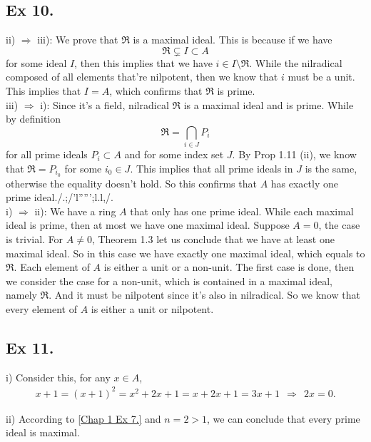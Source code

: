 \subsection{Ex 10.}

ii) $\Rightarrow$ iii): We prove that $\mathfrak R$ is a maximal ideal. This is because if we have
$$\mathfrak R\subsetneq I\subset A$$ for some ideal $I$, then this implies that we have $i\in I\setminus \mathfrak R$. While the nilradical composed of all elements that're nilpotent, then we know that $i$ must be a unit. This implies that $I=A$, which confirms that $\mathfrak R$ is prime.\\

\noindent iii) $\Rightarrow$ i): Since it's a field, nilradical $\mathfrak R$ is a maximal ideal and is prime.
While by definition 
$$\mathfrak R=\bigcap_{i\in J} P_i$$ for all prime ideals $P_i\subset A$ and for some index set $J$. By Prop 1.11 (ii), we know that $\mathfrak R=P_{i_0}$ for some $i_0\in J$. This implies that all prime ideals in $J$ is the same, otherwise the equality doesn't hold. So this confirms that $A$ has exactly one prime ideal./.;/'l''''';l.l,/.\\

\noindent i) $\Rightarrow$ ii): We have a ring $A$ that only has one prime ideal. While each maximal ideal is prime, then at most we have one maximal ideal. Suppose $A=0$, the case is trivial. For $A\neq 0$, Theorem 1.3 let us conclude that we have at least one maximal ideal. So in this case we have exactly one maximal ideal, which equals to $\mathfrak R$. Each element of $A$ is either a unit or a non-unit. The first case is done, then we consider the case for a non-unit, which is contained in a maximal ideal, namely $\mathfrak R$. And it must be nilpotent since it's also in nilradical. So we know that every element of $A$ is either a unit or nilpotent.



\subsection{Ex 11.}

i) Consider this, for any $x\in A$, \begin{align*}
    x+1=(x+1)^2=x^2+2x+1=x+2x+1=3x+1
    ~~\Rightarrow~~ 2x=0.
\end{align*}

\noindent ii) According to \ref{Chap 1 Ex 7.} and $n=2>1$, we can conclude that every prime ideal is maximal.

